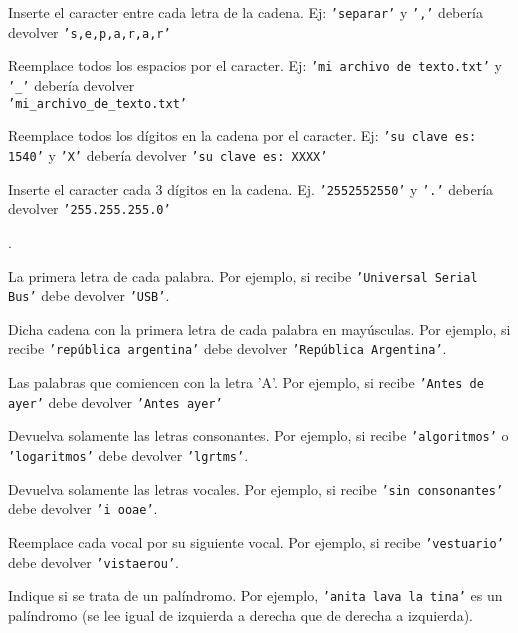 \begin{partes}
\item Inserte el caracter entre cada letra de la cadena. Ej: \texttt{'separar'}
y \texttt{','} debería devolver \texttt{'s,e,p,a,r,a,r'}
\item Reemplace todos los espacios por el caracter. Ej: \texttt{'mi archivo de
texto.txt'} y \texttt{'\_'} debería devolver\\
\texttt{'mi\_archivo\_de\_texto.txt'}
\item Reemplace todos los dígitos en la cadena por el caracter. Ej: \texttt{'su
clave es: 1540'} y \texttt{'X'} debería devolver \texttt{'su clave es: XXXX'}
\item Inserte el caracter cada 3 dígitos en la cadena. Ej.
\texttt{'2552552550'} y \texttt{'.'} debería devolver \texttt{'255.255.255.0'}
\end{partes}




.


\begin{partes}
\item La primera letra de cada palabra. Por ejemplo, si recibe
\texttt{'Universal Serial Bus'} debe devolver \texttt{'USB'}.
\item Dicha cadena con la primera letra de cada palabra en mayúsculas. Por
ejemplo, si recibe \texttt{'república argentina'} debe devolver
\texttt{'República Argentina'}.
\item Las palabras que comiencen con la letra 'A'. Por ejemplo, si recibe
\texttt{'Antes de ayer'} debe devolver \texttt{'Antes ayer'}
\end{partes}


\begin{partes}
\item Devuelva solamente las letras consonantes. Por ejemplo, si recibe
\texttt{'algoritmos'} o \texttt{'logaritmos'} debe devolver \texttt{'lgrtms'}.
\item Devuelva solamente las letras vocales. Por ejemplo, si recibe \texttt{'sin
consonantes'} debe devolver \texttt{'i ooae'}.
\item Reemplace cada vocal por su siguiente vocal. Por ejemplo, si recibe
\texttt{'vestuario'} debe devolver \texttt{'vistaerou'}.
\item Indique si se trata de un palíndromo. Por ejemplo, \texttt{'anita
lava la tina'} es un palíndromo (se lee igual de izquierda a derecha que de
derecha a izquierda).
\end{partes}


